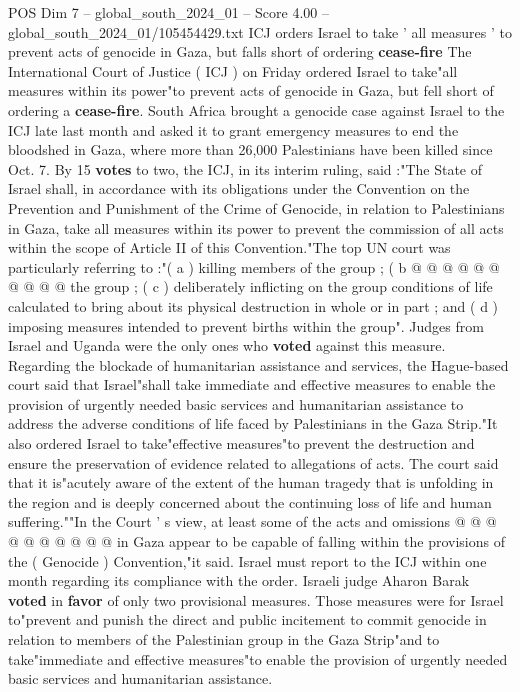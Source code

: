 \begin{textsample}{POS Dim 7 – global\_south\_2024\_01 – Score 4.00 – global\_south\_2024\_01/105454429.txt}  \label{ex:f7_pos_311}
ICJ orders Israel to take ' all measures ' to prevent acts of genocide in Gaza, but falls short of ordering \textbf{cease-fire} The International Court of Justice ( ICJ ) on Friday ordered Israel to take"all measures within its power"to prevent acts of genocide in Gaza, but fell short of ordering a \textbf{cease-fire}.
South Africa brought a genocide case against Israel to the ICJ late last month and asked it to grant emergency measures to end the bloodshed in Gaza, where more than 26,000 Palestinians have been killed since Oct. 7.
By 15 \textbf{votes} to two, the ICJ, in its interim ruling, said :"The State of Israel shall, in accordance with its obligations under the Convention on the Prevention and Punishment of the Crime of Genocide, in relation to Palestinians in Gaza, take all measures within its power to prevent the commission of all acts within the scope of Article II of this Convention."The top UN court was particularly referring to :"( a ) killing members of the group ; ( b @ @ @ @ @ @ @ @ @ @ the group ; ( c ) deliberately inflicting on the group conditions of life calculated to bring about its physical destruction in whole or in part ; and ( d ) imposing measures intended to prevent births within the group".
Judges from Israel and Uganda were the only ones who \textbf{voted} against this measure.
Regarding the blockade of humanitarian assistance and services, the Hague-based court said that Israel"shall take immediate and effective measures to enable the provision of urgently needed basic services and humanitarian assistance to address the adverse conditions of life faced by Palestinians in the Gaza Strip."It also ordered Israel to take"effective measures"to prevent the destruction and ensure the preservation of evidence related to allegations of acts.
The court said that it is"acutely aware of the extent of the human tragedy that is unfolding in the region and is deeply concerned about the continuing loss of life and human suffering.""In the Court ' s view, at least some of the acts and omissions @ @ @ @ @ @ @ @ @ @ in Gaza appear to be capable of falling within the provisions of the ( Genocide ) Convention,"it said.
Israel must report to the ICJ within one month regarding its compliance with the order.
Israeli judge Aharon Barak \textbf{voted} in \textbf{favor} of only two provisional measures.
Those measures were for Israel to"prevent and punish the direct and public incitement to commit genocide in relation to members of the Palestinian group in the Gaza Strip"and to take"immediate and effective measures"to enable the provision of urgently needed basic services and humanitarian assistance.

\end{textsample}
